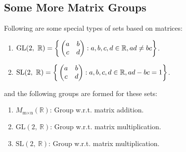 \subsection{Some More Matrix Groups}
Following are some special types of sets based on matrices:
\begin{enumerate}[itemsep=3pt,parsep=0pt,topsep=2pt,partopsep=0pt]
	\item $\text{GL}(2,\ \mathbb{R}) = \bigg{\{} \begin{pmatrix} a & b \\ c & d \\ \end{pmatrix} : a,b,c,d \in \mathbb{R}, ad \neq bc \bigg{\}}$.
	\item $\text{SL}(2,\ \mathbb{R}) = \bigg{\{} \begin{pmatrix} a & b \\ c & d \\ \end{pmatrix} : a,b,c,d \in \mathbb{R}, ad - bc = 1 \bigg{\}}$.
\end{enumerate}
and the following groups are formed for these sets:
\begin{enumerate}[itemsep=1pt,parsep=0pt,topsep=2pt,partopsep=0pt]
	\item $M_{\text{m}\times\text{n}}(\mathbb{R})$: Group w.r.t. matrix addition.
	\item  $\text{GL}(2,\ \mathbb{R})$: Group w.r.t. matrix multiplication.
	\item  $\text{SL}(2,\ \mathbb{R})$: Group w.r.t. matrix multiplication.
\end{enumerate}